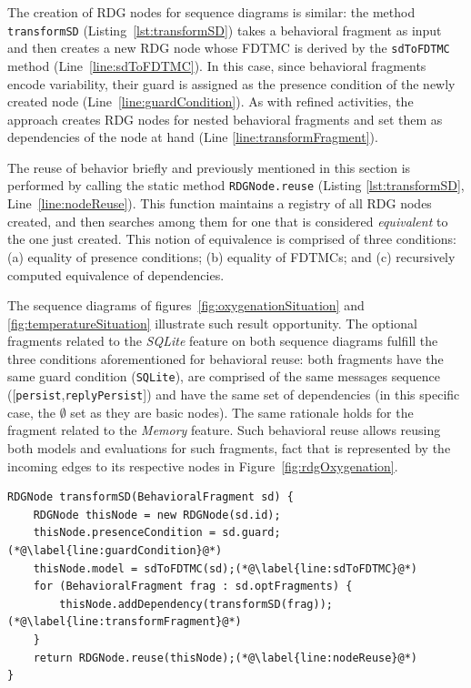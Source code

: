 The creation of RDG nodes for sequence diagrams is similar: the method
\texttt{trans\-form\-SD} (Listing~\ref{lst:transformSD}) takes a behavioral
fragment as input and then creates a new RDG node whose FDTMC is derived by the
\texttt{sd\-To\-FDTMC} method (Line~\ref{line:sdToFDTMC}). In this case, since
behavioral fragments encode variability, their guard is assigned as the presence
condition of the newly created node (Line~\ref{line:guardCondition}). As with
refined activities, the approach creates RDG nodes for nested behavioral
fragments and set them as dependencies of the node at hand (Line
\ref{line:transformFragment}).

The reuse of behavior briefly and previously mentioned in
this section is performed by calling the static method
\texttt{RDG\-Node.\-reuse} (Listing \ref{lst:transformSD},
Line~\ref{line:nodeReuse}). This function maintains a registry of all RDG nodes
created, and then searches among them for one that is considered
\emph{equivalent} to the one just created. This notion of equivalence is
comprised of three conditions: (a) equality of presence conditions; (b) equality
of FDTMCs; and (c) recursively computed equivalence of dependencies.

The sequence diagrams of figures~\ref{fig:oxygenationSituation} and
\ref{fig:temperatureSituation} illustrate such result opportunity. The optional
fragments related to the \emph{SQLite} feature on both sequence diagrams fulfill
the three conditions aforementioned for behavioral reuse: both fragments have
the same guard condition (\texttt{SQLite}), are comprised of the same messages
sequence ([\texttt{persist},\texttt{replyPersist}]) and have the same set of
dependencies (in this specific case, the $\emptyset$ set as they are basic
nodes). The same rationale holds
for the fragment related to the \emph{Memory} feature. Such behavioral reuse
allows reusing both models and evaluations for such fragments, fact that is
represented by the incoming edges to its respective nodes in
Figure~\ref{fig:rdgOxygenation}.

\begin{lstlisting}[label={lst:transformSD},
                   caption={Sequence Diagram transformation},
                   float,
                   breaklines,
		   belowcaptionskip=0.2cm]
RDGNode transformSD(BehavioralFragment sd) {
    RDGNode thisNode = new RDGNode(sd.id);
    thisNode.presenceCondition = sd.guard;(*@\label{line:guardCondition}@*)
    thisNode.model = sdToFDTMC(sd);(*@\label{line:sdToFDTMC}@*)
    for (BehavioralFragment frag : sd.optFragments) {
        thisNode.addDependency(transformSD(frag));(*@\label{line:transformFragment}@*)
    }
    return RDGNode.reuse(thisNode);(*@\label{line:nodeReuse}@*)
}
\end{lstlisting}




